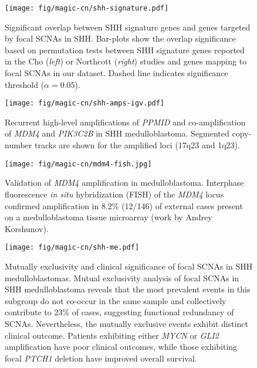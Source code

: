 \documentclass[11pt,letterpaper]{article}
\theoremstyle{definition}
\begin{document}
\clearpage

\begin{SCfigure}
	\centering
	\texttt{[image: fig/magic-cn/shh-signature.pdf]}
	\caption[Overlap between SHH signature genes and genes targeted by focal SCNAs in SHH]
	{
	Significant overlap between SHH signature genes and genes targeted by focal SCNAs in SHH.
	Bar-plots show the overlap significance based on permutation tests between SHH signature genes reported in the Cho (\emph{left}) or Northcott (\emph{right}) studies and genes mapping to focal SCNAs in our dataset. Dashed line indicates significance threshold ($\alpha = 0.05$).
	}
	\label{fig:shh-signature}
\end{SCfigure}

\begin{SCfigure}
	\centering
	\texttt{[image: fig/magic-cn/shh-amps-igv.pdf]}
	\caption[Recurrent amplifications of \emph{PPMID}, \emph{MDM4}, and \emph{PIK3C2B} in SHH medulloblastoma]
	{
	Recurrent high-level amplifications of \emph{PPMID} and co-amplification of \emph{MDM4} and \emph{PIK3C2B} in SHH medulloblastoma.
	Segmented copy-number tracks are shown for the amplified loci (17q23 and 1q23).
	}
	\label{fig:shh-amps-igv}
\end{SCfigure}

\begin{SCfigure}
	\centering
	\texttt{[image: fig/magic-cn/mdm4-fish.jpg]}
	\caption[Validation of \emph{MDM4} amplification in medulloblastoma]
	{
	Validation of \emph{MDM4} amplification in medulloblastoma.
	Interphase fluorescence \emph{in situ} hybridization (FISH) of the \emph{MDM4} locus confirmed amplification in 8.2\% (12/146) of external cases present on a medulloblastoma tissue microarray (work by Andrey Korshunov).
	}
	\label{fig:mdm4-fish}
\end{SCfigure}

\clearpage

\begin{figure}[h]
	\begin{center}
		\texttt{[image: fig/magic-cn/shh-me.pdf]}
	\end{center}
	\caption[Mutually exclusivity and clinical significance of focal SCNAs in SHH medulloblastomas]
	{
	Mutually exclusivity and clinical significance of focal SCNAs in SHH medulloblastomas.
	Mutual exclusivity analysis of focal SCNAs in SHH medulloblastoma reveals that the most prevalent events in this subgroup do not co-occur in the same sample and collectively contribute to 23\% of cases, suggesting functional redundancy of SCNAs. Nevertheless, the mutually exclusive events exhibit distinct clinical outcome. Patients exhibiting either \emph{MYCN} or \emph{GLI2} amplification have poor clinical outcomes, while those exhibiting focal \emph{PTCH1} deletion have improved overall survival.
	}
	\label{fig:shh-me}
\end{figure}
\end{document}
